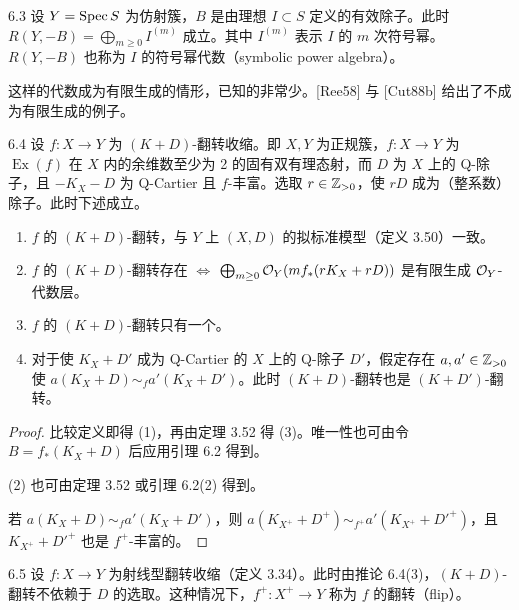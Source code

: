 \begin{remark}{6.3}
设 $Y=\operatorname{Spec} S$ 为仿射簇，$B$ 是由理想 $I\subset S$ 定义的有效除子。此时 $R(Y,-B)=\bigoplus_{m\ge0}I^{(m)}$ 成立。其中 $I^{(m)}$ 表示 $I$ 的 $m$ 次符号幂。$R(Y,-B)$ 也称为 $I$ 的符号幂代数（symbolic power algebra）。
\end{remark}

这样的代数成为有限生成的情形，已知的非常少。[Ree58] 与 [Cut88b] 给出了不成为有限生成的例子。

\begin{corollaryp}{6.4}
设 $f:X\to Y$ 为 $(K+D)$-翻转收缩。即 $X,Y$ 为正规簇，$f:X\to Y$ 为 $\operatorname{Ex}(f)$ 在 $X$ 内的余维数至少为 2 的固有双有理态射，而 $D$ 为 $X$ 上的 Q-除子，且 $-K_X-D$ 为 Q-Cartier 且 $f$-丰富。选取 $r\in\mathbb{Z}_{>0}$，使 $rD$ 成为（整系数）除子。此时下述成立。

\begin{enumerate}[label=（\arabic*）,leftmargin=2.8em]
\item $f$ 的 $(K+D)$-翻转，与 $Y$ 上 $(X,D)$ 的拟标准模型（定义 3.50）一致。
\item $f$ 的 $(K+D)$-翻转存在 $\iff$ $\bigoplus_{m\ge0}\mathcal{O}_Y(mf_*(rK_X+rD))$ 是有限生成 $\mathcal{O}_Y$-代数层。
\item $f$ 的 $(K+D)$-翻转只有一个。
\item 对于使 $K_X+D'$ 成为 Q-Cartier 的 $X$ 上的 Q-除子 $D'$，假定存在 $a,a'\in\mathbb{Z}_{>0}$ 使 $a(K_X+D)\sim_f a'(K_X+D')$。此时 $(K+D)$-翻转也是 $(K+D')$-翻转。
\end{enumerate}
\end{corollaryp}

\begin{proof}
比较定义即得 (1)，再由定理 3.52 得 (3)。唯一性也可由令 $B=f_*(K_X+D)$ 后应用引理 6.2 得到。

(2) 也可由定理 3.52 或引理 6.2(2) 得到。

若 $a(K_X+D)\sim_f a'(K_X+D')$，则 $a(K_{X^+}+D^+)\sim_{f^+}a'(K_{X^+}+D'^+)$，且 $K_{X^+}+D'^+$ 也是 $f^+$-丰富的。
\end{proof}


\begin{definition}{6.5}
设 $f:X\to Y$ 为射线型翻转收缩（定义 3.34）。此时由推论 6.4(3)，$(K+D)$-翻转不依赖于 $D$ 的选取。这种情况下，$f^+:X^+\to Y$ 称为 $f$ 的翻转（flip）。
\end{definition}

